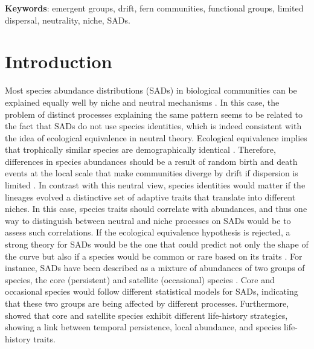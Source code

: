 \documentclass[12pt]{article}
\begin{document}


{\bf Keywords}: emergent groups, drift, fern communities, functional groups, limited dispersal, neutrality, niche, SADs.

\newpage

\section*{Introduction}

Most species abundance distributions (SADs) in biological communities can be explained equally well by niche and neutral mechanisms \citep{McGill2007}. 
In this case, the problem of distinct processes explaining the same pattern seems to be related to the fact that SADs do not use species identities, which is indeed consistent with the idea of ecological equivalence in neutral theory. Ecological equivalence implies that trophically similar species are demographically identical \citep{Hubbell2001, Hubbell2005}. Therefore, differences in species abundances should be a result of random birth and death events at the local scale that make communities diverge by drift if dispersion is limited \citep{Hubbell2001, Hubbell2005}. 
In contrast with this neutral view, species identities would matter if the lineages evolved a distinctive set of adaptive traits that translate into different niches. In this case, species traits should correlate with abundances, and thus one way to distinguish between neutral and niche processes on SADs would be to assess such correlations. 
If the ecological equivalence hypothesis is rejected, a strong theory for SADs would be the one that could predict not only the shape of the curve but also if a species would be common or rare based on its traits \citep{Mcgill2003}. 
For instance, SADs have been described as a mixture of abundances of two groups of species, the core (persistent) and satellite (occasional) species \citep{Magurran2003}.
Core and occasional species would follow different statistical models for SADs, indicating that these two groups are being affected by different processes. Furthermore, \cite{Supp2015} showed that core and satellite species exhibit different life-history strategies, showing a link between temporal persistence, local abundance, and species life-history traits.
\end{document}
